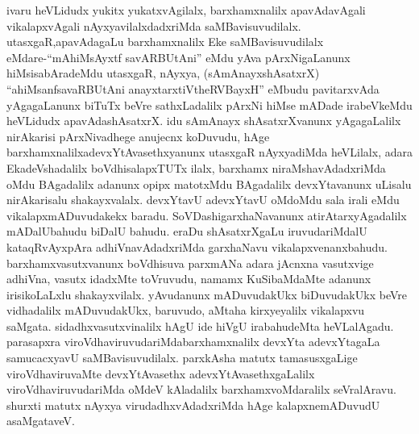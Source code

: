 \begin{artha}
ivaru heVLidudx yukitx yukatxvAgilalx, barxhamxnalilx apavAdavAgali vikalapxvAgali nAyxyavilalxdadxriMda saMBavisuvudilalx. utasxgaR,\break apavAdagaLu barxhamxnalilx Eke saMBavisuvudilalx eMdare-\break ``mAhiMsAyxtf savARBUtAni'' eMdu yAva pArxNigaLanunx hiMsisabAradeMdu utasxgaR, nAyxya, (sAmAnayxshAsatxrX) ``ahiMsanf\break savaRBUtAni anayxtarxtiVtheRVBayxH'' eMbudu pavitarxvAda yAgagaLanunx biTuTx beVre sathxLadalilx pArxNi hiMse mADade irabeVkeMdu heVLidudx apavAdashAsatxrX. idu sAmAnayx shAsatxrXvanunx yAgagaLalilx nirAkarisi pArxNivadhege anujecnx koDuvudu, hAge barxhamxnalilx\break adevxYtAvasethxyanunx utasxgaR nAyxyadiMda heVLilalx, adara EkadeVshadalilx boVdhisalapxTUTx ilalx, barxhamx niraMshavAdadxriMda oMdu BAgadalilx adanunx opipx matotxMdu BAgadalilx devxYtavanunx uLisalu nirAkarisalu shakayxvalalx. devxYtavU adevxYtavU oMdoMdu sala irali eMdu vikalapxmADuvudakekx baradu. SoVDashigarxhaNavanunx atirAtarxyAgadalilx mADalUbahudu biDalU bahudu. eraDu shAsatxrXgaLu iruvudariMdalU kataqRvAyxpAra adhiVnavAdadxriMda garxhaNavu vikalapxvenanxbahudu. barxhamxvasutxvanunx boVdhisuva parxmANa adara jAcnxna vasutxvige adhiVna, vasutx idadxMte toVruvudu, namamx KuSibaMdaMte adanunx irisikoLaLxlu shakayxvilalx. yAvudanunx mADuvudakUkx biDuvudakUkx beVre vidhadalilx mADuvudakUkx, baruvudo, aMtaha kirxyeyalilx vikalapxvu saMgata. sidadhxvasutxvinalilx hAgU ide hiVgU irabahudeMta heVLalAgadu. parasapxra viroVdhaviruvudariMda\break barxhamxnalilx devxYta adevxYtagaLa samucacxyavU saMBavisuvudilalx. parxkAsha matutx tamasusxgaLige viroVdhaviruvaMte devxYtAvasethx adevxYtAvasethxgaLalilx viroVdhaviruvudariMda oMdeV kAladalilx barxhamxvoMdaralilx seVralAravu. shurxti matutx nAyxya virudadhxvAdadxriMda hAge kalapxne\break mADuvudU asaMgataveV.
\end{artha}

